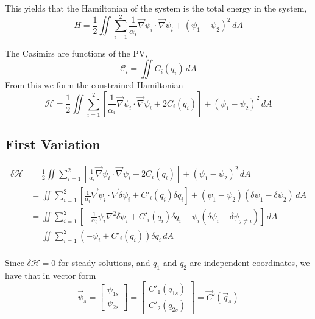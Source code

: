 \documentclass[12pt]{article}
\begin{document}
This yields that the Hamiltonian of the system is the total energy in the system,
$$
H = \frac12 \iint \sum_{i=1}^2 \frac{1}{\alpha_i}\vec\nabla \psi_i \cdot \vec\nabla \psi_i + (\psi_1 - \psi_2)^2 \, dA
$$

The Casimirs are functions of the PV,
$$
\mathcal{C}_i = \iint C_i(q_i) \, dA
$$
From this we form the constrained Hamiltonian
\begin{equation}
\mathcal{H} = \frac12 \iint \sum_{i=1}^2 \left[ \frac{1}{\alpha_i} \vec\nabla \psi_i \cdot \vec\nabla \psi_i + 2C_i(q_i) \right]+ (\psi_1 - \psi_2)^2 \, dA
\label{eqn:qg_tl_h}
\end{equation}

\subsection{First Variation}
\begin{align*}
\delta \mathcal{H} &= \frac12 \iint \sum_{i=1}^2 \left[ \frac{1}{\alpha_i} \vec\nabla \psi_i \cdot \vec\nabla \psi_i + 2C_i(q_i) \right]+ (\psi_1 - \psi_2)^2 \, dA \\
 &= \iint \sum_{i=1}^2 \left[ \frac{1}{\alpha_i} \vec\nabla \psi_i \cdot \vec\nabla \delta\psi_i + C'_i(q_i) \delta q_i \right]+ (\psi_1 - \psi_2)(\delta \psi_1 - \delta \psi_2) \, dA \\
 &= \iint \sum_{i=1}^2 \left[ -\frac{1}{\alpha_i} \psi_i \nabla^2 \delta\psi_i + C'_i(q_i) \delta q_i - \psi_i(\delta \psi_i - \delta \psi_{j \ne i}) \right] \, dA \\
 &= \iint \sum_{i=1}^2 (-\psi_i + C'_i(q_i)) \delta q_i\, dA \\
\end{align*}

Since $\delta \mathcal{H} = 0$ for steady solutions, and $q_1$ and $q_2$ are independent coordinates, we have that in vector form
\begin{equation}
\vec \psi_s = 
\left[\begin{array}{c}
\psi_{1s} \\
\psi_{2s}
\end{array}\right]
=
\left[\begin{array}{c}
C'_1(q_{1s}) \\
C'_2(q_{2s})
\end{array}\right]
=
\vec C'(\vec q_s)
\end{equation}

\end{document}
